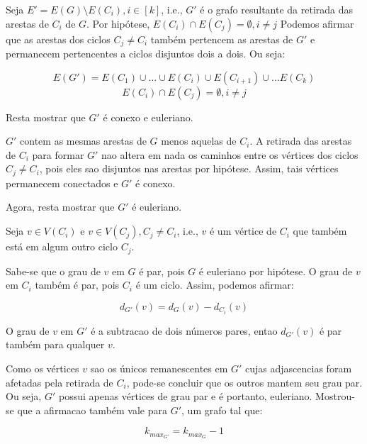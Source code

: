 \documentclass{article}
\begin{document}
 Seja $E'= E(G) \setminus E(C_i), i \in [k]$, i.e., $G'$ é o grafo resultante da retirada das arestas de $C_i$ de $G$. Por hipótese, $E(C_i) \cap E(C_j) = \emptyset, i\neq j$ Podemos afirmar que as arestas dos ciclos $C_j \neq C_i$ também pertencem as arestas de $G'$ e permanecem pertencentes a ciclos disjuntos dois a dois. Ou seja:
 
 $$
 E(G') = E(C_1) \cup \ldots \cup E(C_i) \cup E(C_{i+1}) \cup \ldots E(C_k)
 $$
 $$
 E(C_i) \cap E(C_j) = \emptyset, i\neq j
 $$
 
 Resta mostrar que $G'$ é conexo e euleriano.
 
 $G'$ contem as mesmas arestas de $G$ menos aquelas de $C_i$. A retirada das arestas de $C_i$ para formar $G'$ nao altera em nada os caminhos entre os vértices dos ciclos $C_j \neq C_i$, pois eles sao disjuntos nas arestas por hipótese. Assim, tais vértices permanecem conectados e $G'$ é conexo.
 
 Agora, resta mostrar que $G'$ é euleriano.
 
 Seja $v \in V(C_i)$ e $v \in V(C_j), C_j \neq C_i$, i.e., $v$ é um vértice de $C_i$ que também está em algum outro ciclo $C_j$.
 
 Sabe-se que o grau de $v$ em $G$ é par, pois $G$ é euleriano por hipótese. O grau de $v$ em $C_i$ também é par, pois $C_i$ é um ciclo. Assim, podemos afirmar:
 
 $$
 d_{G'}(v) = d_G(v) - d_{C_i}(v)
 $$
 
 O grau de $v$ em $G'$ é a subtracao de dois números pares, entao $ d_{G'}(v)$ é par também para qualquer $v$.
 
 Como os vértices $v$ sao os únicos remanescentes em $G'$ cujas adjascencias foram afetadas pela retirada de $C_i$, pode-se concluir que os outros mantem seu grau par. Ou seja, $G'$ possui apenas vértices de grau par e é portanto, euleriano. Mostrou-se que a afirmacao também vale para $G'$, um grafo tal que:
 
 $$k_{max_{G'}} = k_{max_G} - 1$$ 
 
 
 \clearpage
 
 

 
 
 
\end{document}
